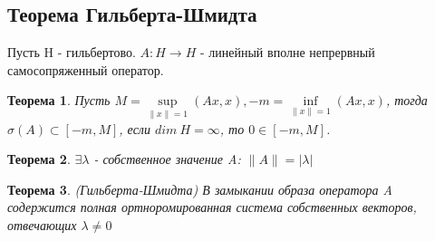 \documentclass[9pt, a4paper]{extarticle}
\newtheorem{theorem}{Теорема}
\numberwithin{equation}{section}
\numberwithin{lemma}{section}
\numberwithin{definition}{section}
\numberwithin{notabene}{section}
\numberwithin{corollary}{section}
\begin{document}
\subsection{Теорема Гильберта-Шмидта}
	Пусть H - гильбертово. $A: H \to H$ - линейный вполне непрервный самосопряженный оператор.
	\begin{theorem}
		Пусть $M = \sup\limits_{\|x\| = 1} (Ax, x), -m = \inf\limits_{\|x\| = 1} (Ax, x)$, тогда $\sigma(A) \subset [-m, M]$, если $dim\ H = \infty$, то $0 \in [-m, M]$. 
	\end{theorem}
	\begin{theorem}
		$\exists \lambda$ - собственное значение A: $\|A\| = |\lambda|$
	\end{theorem}
	\begin{theorem}
		(Гильберта-Шмидта)\newline
		В замыкании образа оператора A содержится полная ортноромированная система собственных векторов, отвечающих $\lambda \neq 0$
	\end{theorem}
\end{document}

